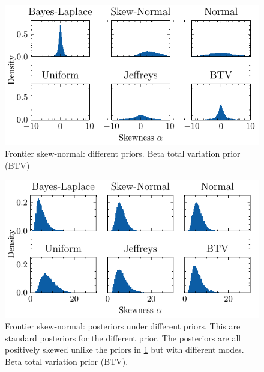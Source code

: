 \documentclass[12pt]{article}
\begin{document}
\begin{figure}
	\begin{center}
		\includegraphics{imgs/prior_histograms1.pdf}
	\end{center}
	\caption{Frontier skew-normal: different priors. Beta total variation prior (BTV)}\label{fig:skew_prior}
\end{figure}
\begin{figure}
	\begin{center}
		\includegraphics{imgs/posterior_histograms1.pdf}
	\end{center}
	\caption{Frontier skew-normal: posteriors under different priors. This are standard posteriors for the different prior. The posteriors are all positively skewed unlike the priors in \cref{fig:skew_prior} but with different modes. Beta total variation prior (BTV).}\label{fig:skew_pos}
\end{figure}
\end{document}
